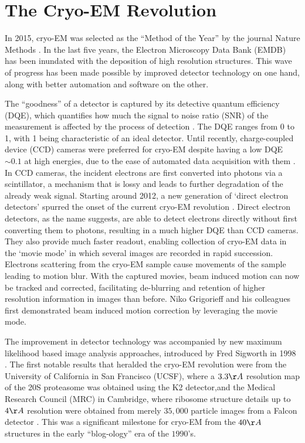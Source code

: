 \section{The Cryo-EM Revolution}
In 2015, cryo-EM was selected as the ``Method of the Year'' by the journal Nature Methods \cite{nature_method}. In the last five years, the Electron Microscopy Data Bank (EMDB) has been inundated with the deposition of high resolution structures. This wave of progress has been made possible by improved detector technology on one hand, along with better automation and software on the other. 

The ``goodness'' of a detector is captured by its detective quantum efficiency (DQE), which quantifies how much the signal to noise ratio (SNR) of the measurement is affected by the process of detection \cite{dainty1974}. The DQE ranges from 0 to 1, with 1 being characteristic of an ideal detector. Until recently, charge-coupled device (CCD) cameras were preferred for cryo-EM despite having a low DQE $\sim 0.1$ at high energies, due to the ease of automated data acquisition with them \cite{Sander200592}. In CCD cameras, the incident electrons are first converted into photons via a scintillator, a mechanism that is lossy and leads to further degradation of the already weak signal. Starting around 2012, a new generation of `direct electron detectors' spurred the onset of the current cryo-EM revolution \cite{faruki}. Direct electron detectors, as the name suggests, are able to detect electrons directly without first converting them to photons, resulting in a much higher DQE than CCD cameras. They also provide much faster readout, enabling collection of cryo-EM data in the `movie mode' in which several images are recorded in rapid succession. Electrons scattering from the cryo-EM sample cause movements of the sample leading to motion blur. With the captured movies, beam induced motion can now be tracked and corrected, facilitating de-blurring and retention of higher resolution information in images than before. Niko Grigorieff and his colleagues first demonstrated beam induced motion correction by leveraging the movie mode.

The improvement in detector technology was accompanied by new maximum likelihood based image analysis approaches, introduced by Fred Sigworth \cite{sigworth_rev} in 1998 \cite{sigworth1998}. The first notable results that heralded the cryo-EM revolution were from the University of California in San Francisco (UCSF), where a $3.3 \AA$ resolution map of the 20S proteasome was obtained using the K2 detector,and the Medical Research Council (MRC) in Cambridge, where ribosome structure details up to $4 \AA$ resolution were obtained from merely $35,000$ particle images from a Falcon detector \cite{ycheng_natmeth, Li2013InfluenceOE, Bai2013RibosomeST}. This was a significant milestone for cryo-EM from the $40 \AA$ structures in the early ``blog-ology'' era of the $1990$'s.

